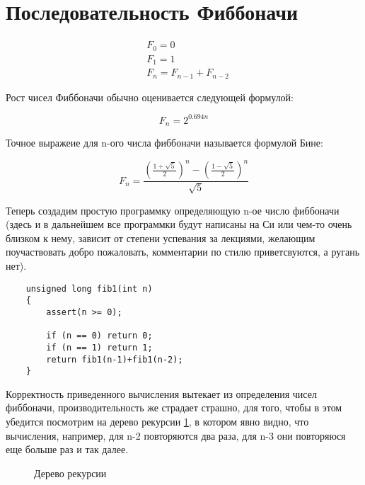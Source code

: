 \section{Последовательность Фиббоначи}

\begin{equation}
	\begin{split}
		& F _0 = 0 \\
		& F _1 = 1 \\
		& F _n = F _{n-1} + F _{n-2}
	\end{split}
\end{equation}

Рост чисел Фиббоначи обычно оценивается следующей формулой:

\begin{equation}
	F _n = 2^{0.694 n}
	\label{math::fib_approx}
\end{equation}

Точное выражеие для n-ого числа фиббоначи называется формулой Бине:

\begin{equation}
	F _n = \frac{
		{\left (
			\frac{1 + \sqrt{5} } {2}
		\right )}^{n} - {
		\left (
			\frac{1 - \sqrt{5} } {2}
		\right )}^{n}
	}{\sqrt{5}}
\end{equation}

Теперь создадим простую программку определяющую n-ое число фиббоначи (здесь и в дальнейшем все программки будут написаны на Си или чем-то очень близком к нему, зависит от степени успевания за лекциями, желающим поучаствовать добро пожаловать, комментарии по стилю приветсвуются, а ругань нет).

\begin{lstlisting}
	unsigned long fib1(int n)
	{
		assert(n >= 0);

		if (n == 0) return 0;
		if (n == 1) return 1;
		return fib1(n-1)+fib1(n-2);
	}
\end{lstlisting}

Корректность приведенного вычисления вытекает из определения чисел фиббоначи, производительность же страдает страшно, для того, чтобы в этом убедится посмотрим на дерево рекурсии \ref{pic::rec_tree}, в котором явно видно, что вычисления, например, для n-2 повторяются два раза, для n-3 они повторяюся еще больше раз и так далее.

\begin{figure}[h]
	\noindent{}
	\caption{Дерево рекурсии}
	\label{pic::rec_tree}
\end{figure}


